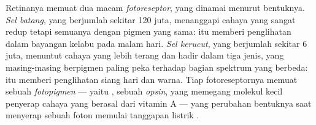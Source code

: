 \begin{definition}[Fotoreseptor]\label{def:g11:the-eye:photoreceptors}
Retinanya memuat dua macam 
\emph{fotoreseptor}, yang dinamai menurut
bentuknya. \emph{Sel batang}, yang berjumlah sekitar
120 juta, menanggapi cahaya yang sangat redup tetapi semuanya dengan
pigmen yang sama:  itu memberi penglihatan dalam bayangan kelabu
pada malam hari. \emph{Sel kerucut}, yang berjumlah
sekitar 6 juta, menuntut cahaya yang lebih terang dan hadir dalam tiga
jenis, yang masing-masing berpigmen paling peka terhadap bagian
spektrum yang berbeda:  itu memberi penglihatan siang hari dan
warna. Tiap fotoreseptornya memuat sebuah \emph{fotopigmen} --- yaitu
, sebuah \emph{opsin}, yang memegang molekul kecil
penyerap cahaya yang berasal dari vitamin A --- yang perubahan
bentuknya saat menyerap sebuah foton memulai tanggapan listrik .
\end{definition}

